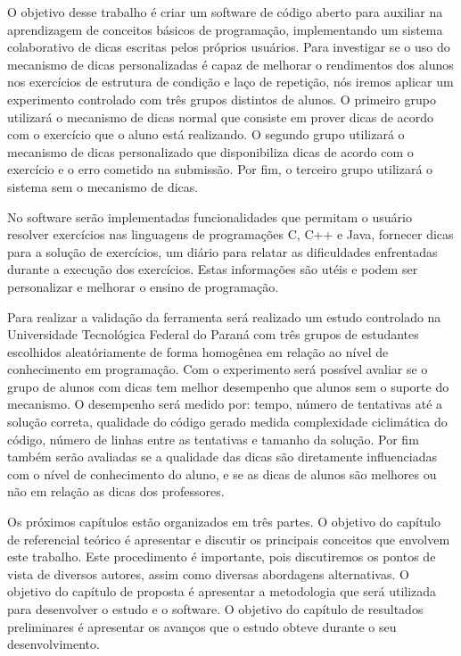 O objetivo desse trabalho é criar um software de código aberto para auxiliar na aprendizagem de conceitos básicos de programação, implementando um sistema colaborativo de dicas escritas pelos próprios usuários. Para investigar se o uso do mecanismo de dicas personalizadas é capaz de melhorar o rendimentos dos alunos nos exercícios de estrutura de condição e laço de repetição, nós iremos aplicar um experimento controlado com três grupos distintos de alunos. O primeiro grupo utilizará o mecanismo de dicas normal que consiste em prover dicas de acordo com o exercício que o aluno está realizando. O segundo grupo utilizará o mecanismo de dicas personalizado que disponibiliza dicas de acordo com o exercício e o erro cometido na submissão. Por fim, o terceiro grupo utilizará o sistema sem o mecanismo de dicas.

No software serão implementadas funcionalidades que permitam o usuário resolver exercícios nas linguagens de programações C, C++ e Java, fornecer dicas para a solução de exercícios, um diário para relatar as dificuldades enfrentadas durante a execução dos exercícios. Estas informações são utéis e podem ser personalizar e melhorar o ensino de programação.

Para realizar a validação da ferramenta será realizado um estudo controlado na Universidade Tecnológica Federal do Paraná com três grupos de estudantes escolhidos aleatóriamente de forma homogênea em relação ao nível de conhecimento em programação. Com o experimento será possível avaliar se o grupo de alunos com dicas tem melhor desempenho que alunos sem o suporte do mecanismo. O desempenho será medido por: tempo, número de tentativas até a solução correta, qualidade do código gerado medida complexidade ciclimática do código, número de linhas entre as tentativas e tamanho da solução. Por fim também serão avaliadas se a qualidade das dicas são diretamente influenciadas com o nível de conhecimento do aluno, e se as dicas de alunos são melhores ou não em relação as dicas dos professores.

Os próximos capítulos estão organizados em três partes. O objetivo do capítulo de referencial teórico é apresentar e discutir os principais conceitos que envolvem este trabalho. Este  procedimento é importante, pois discutiremos os pontos de vista de diversos autores, assim como diversas abordagens alternativas. O objetivo do capítulo de proposta é apresentar a metodologia que será utilizada para desenvolver o estudo e o software. O objetivo do capítulo de resultados preliminares é apresentar os avanços que o estudo obteve durante o seu desenvolvimento.